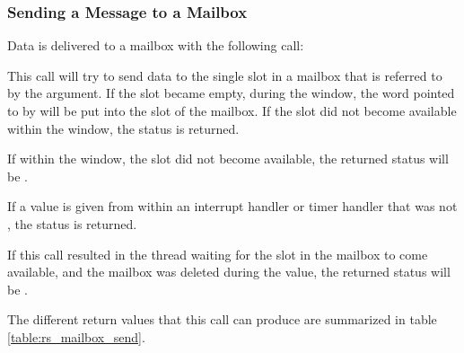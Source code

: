
\subsubsection{Sending a Message to a Mailbox}

Data is delivered to a mailbox with the following call:


This call will try to send data to the single slot in a mailbox that is referred to by the
 argument. If the slot became empty, during the  window, the word pointed to
by  will be put into the slot of the mailbox. If the slot did not become available within the
 window, the status  is returned. 

If within the  window, the slot did not become available, the returned status will
be .

If a  value is given from within an interrupt handler or timer handler that was not
, the status  is returned.

If this call resulted in the thread waiting for
the slot in the mailbox to come available, and the mailbox was deleted during the
 value, the returned status will be .

The different return values that this call can produce are summarized in
table \ref{table:rs_mailbox_send}.

